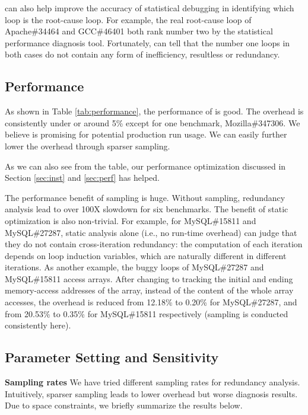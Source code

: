 \Tool can also help improve the accuracy of statistical debugging in
identifying which loop is the root-cause loop.
For example, the real root-cause loop of Apache\#34464 and GCC\#46401 both
rank number two by the statistical performance diagnosis tool.
Fortunately,
\Tool can tell that the number one loops in both cases do not contain
any form of inefficiency, resultless or redundancy. 

\subsection{Performance}
\label{sec:result_perf}



As shown in Table \ref{tab:performance}, 
the performance of \Tool is good. The overhead is consistently under or around 5\% 
except for one benchmark, Mozilla\#347306. 
We believe \Tool is promising for potential production
run usage.
We can easily further lower the overhead through sparser sampling.

As we can also see from the table, our performance optimization discussed in 
Section \ref{sec:inst} and \ref{sec:perf} has helped.

The performance benefit of sampling is huge.
Without sampling, redundancy
analysis lead to over 100X slowdown for six benchmarks.
The benefit of static optimization is also non-trivial. 
For example, for MySQL\#15811 and MySQL\#27287, static analysis alone
(i.e., no run-time overhead) can
judge that they do not contain cross-iteration redundancy: the computation of 
each iteration depends on loop induction variables, which are naturally different
in different iterations. 
As another example, the buggy loops of MySQL\#27287 and MySQL\#15811 access 
arrays. 
After changing to tracking the initial and ending memory-access addresses
of the array, instead of the content of the whole array accesses,
the overhead is reduced from 12.18\% to 0.20\% for MySQL\#27287, 
and from 20.53\% to 0.35\% for MySQL\#15811 respectively 
(sampling is conducted consistently here). 

\subsection{Parameter Setting and Sensitivity}
\label{sec:sensi}
\noindent\textbf{Sampling rates}
We have tried different sampling rates for redundancy analysis.
Intuitively, sparser sampling leads to lower overhead but worse diagnosis
results. Due to space constraints, we briefly summarize the results below.

